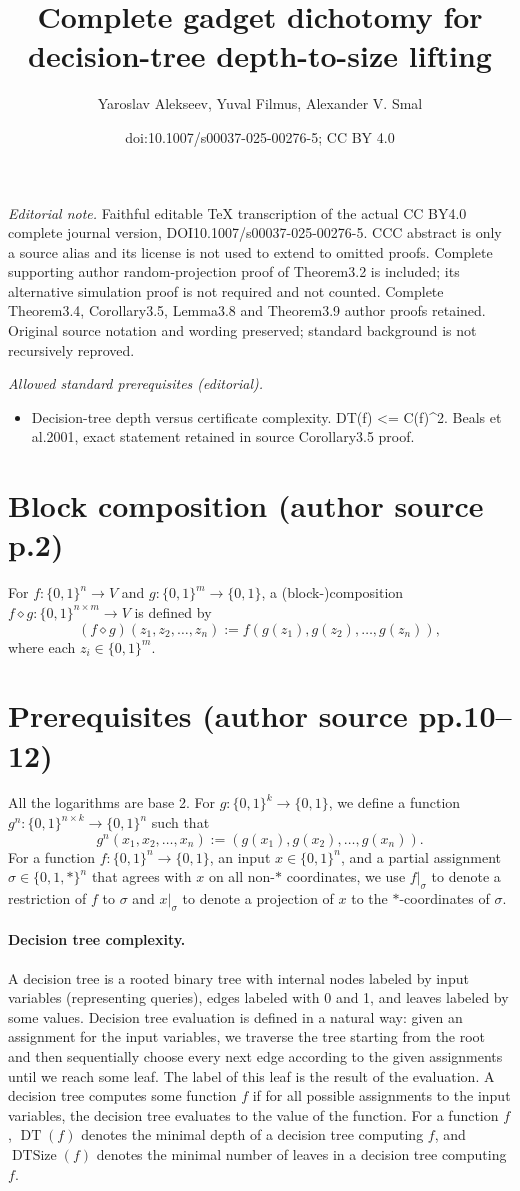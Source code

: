 \documentclass[10pt,a4paper]{article}
\title{Complete gadget dichotomy for decision-tree depth-to-size lifting}
\author{Yaroslav Alekseev, Yuval Filmus, Alexander V. Smal}
\date{doi:10.1007/s00037-025-00276-5; CC BY 4.0}
\newcommand{\bits}{\{0,1\}}
\newcommand{\DT}{\operatorname{DT}}
\newcommand{\DTSize}{\operatorname{DTSize}}
\newcommand{\comp}{\diamond}
\begin{document}
\maketitle
\noindent\textit{Editorial note.} Faithful editable TeX transcription of the actual CC BY4.0 complete journal version, DOI10.1007/s00037-025-00276-5. CCC abstract is only a source alias and its license is not used to extend to omitted proofs. Complete supporting author random-projection proof of Theorem3.2 is included; its alternative simulation proof is not required and not counted. Complete Theorem3.4, Corollary3.5, Lemma3.8 and Theorem3.9 author proofs retained. Original source notation and wording preserved; standard background is not recursively reproved.\par\medskip
\noindent\textit{Allowed standard prerequisites (editorial).}\begin{itemize}
\item Decision-tree depth versus certificate complexity. DT(f) <= C(f)\textasciicircum{}2. Beals et al.2001, exact statement retained in source Corollary3.5 proof.
\end{itemize}\medskip
\section*{Block composition (author source p.2)}
For $f:\bits^n\to V$ and $g:\bits^m\to\bits$, a (block-)composition $f\comp g:\bits^{n\times m}\to V$ is defined by
\[(f\comp g)(z_1,z_2,\ldots,z_n):=f(g(z_1),g(z_2),\ldots,g(z_n)),\]
where each $z_i\in\bits^m$.
\section*{Prerequisites (author source pp.10--12)}
All the logarithms are base 2. For $g:\bits^k\to\bits$, we define a function $g^n:\bits^{n\times k}\to\bits^n$ such that
\[g^n(x_1,x_2,\ldots,x_n):=(g(x_1),g(x_2),\ldots,g(x_n)).\]
For a function $f:\bits^n\to\bits$, an input $x\in\bits^n$, and a partial assignment $\sigma\in\{0,1,*\}^n$ that agrees with $x$ on all non-$*$ coordinates, we use $f|_\sigma$ to denote a restriction of $f$ to $\sigma$ and $x|_\sigma$ to denote a projection of $x$ to the $*$-coordinates of $\sigma$.
\paragraph{Decision tree complexity.} A decision tree is a rooted binary tree with internal nodes labeled by input variables (representing queries), edges labeled with 0 and 1, and leaves labeled by some values. Decision tree evaluation is defined in a natural way: given an assignment for the input variables, we traverse the tree starting from the root and then sequentially choose every next edge according to the given assignments until we reach some leaf. The label of this leaf is the result of the evaluation. A decision tree computes some function $f$ if for all possible assignments to the input variables, the decision tree evaluates to the value of the function. For a function $f$, $\DT(f)$ denotes the minimal depth of a decision tree computing $f$, and $\DTSize(f)$ denotes the minimal number of leaves in a decision tree computing $f$.
\end{document}
